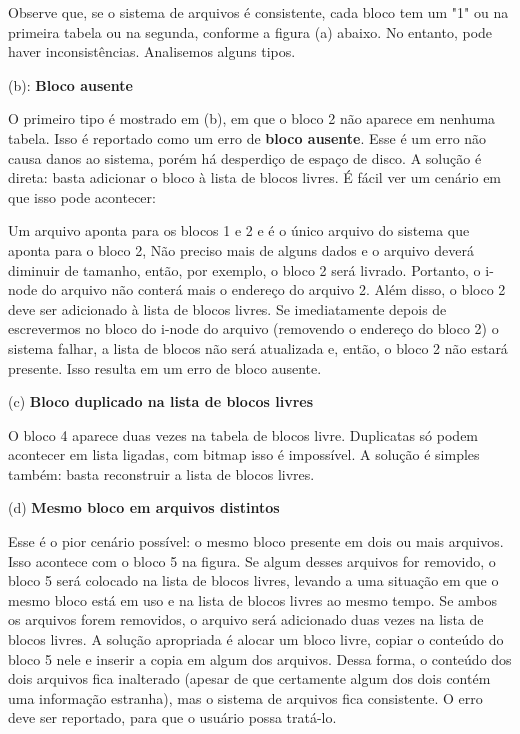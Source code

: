\documentclass{article}
\begin{document}
Observe que, se o sistema de arquivos é consistente, cada bloco tem um "1" ou na primeira tabela ou na segunda, conforme a figura {\color{blue}(a)} abaixo. No entanto, pode haver inconsistências. Analisemos alguns tipos. 

{\color{blue} (b): \textbf{Bloco ausente}}

O primeiro tipo é mostrado em (b), em que o bloco 2 não aparece em nenhuma tabela. Isso é reportado como um erro de \textbf{bloco ausente}. Esse é um erro não causa danos ao sistema, porém há desperdiço de espaço de disco. A solução é direta: basta adicionar o bloco à lista de blocos livres. É fácil ver um cenário em que isso pode acontecer:

Um arquivo aponta para os blocos 1 e 2 e é o único arquivo do sistema que aponta para o bloco 2, Não preciso mais de alguns dados e o arquivo deverá diminuir de tamanho, então, por exemplo, o bloco 2 será livrado. Portanto, o i-node do arquivo não conterá mais o endereço do arquivo 2. Além disso, o bloco 2 deve ser adicionado à lista de blocos livres. Se imediatamente depois de escrevermos no bloco do i-node do arquivo (removendo o endereço do bloco 2) o sistema falhar, a lista de blocos não será atualizada e, então, o bloco 2 não estará presente. Isso resulta em um erro de bloco ausente. 

{\color{blue} (c) \textbf{Bloco duplicado na lista de blocos livres}}

O bloco 4 aparece duas vezes na tabela de blocos livre. Duplicatas só podem acontecer em lista ligadas, com bitmap isso é impossível. A solução é simples também: basta reconstruir a lista de blocos livres.



{\color{blue} (d) \textbf{Mesmo bloco em arquivos distintos}}

Esse é o pior cenário possível: o mesmo bloco presente em dois ou mais arquivos. Isso acontece com o bloco 5 na figura. Se algum desses arquivos for removido, o bloco 5 será colocado na lista de blocos livres, levando a uma situação em que o mesmo bloco está em uso e na lista de blocos livres ao mesmo tempo. Se ambos os arquivos forem removidos, o arquivo será adicionado duas vezes na lista de blocos livres. A solução apropriada é alocar um bloco livre, copiar o conteúdo do bloco 5 nele e inserir a copia em algum dos arquivos. Dessa forma, o conteúdo dos dois arquivos fica inalterado (apesar de que certamente algum dos dois contém uma informação estranha), mas o sistema de arquivos fica consistente. O erro deve ser reportado, para que o usuário possa tratá-lo.
\end{document}
